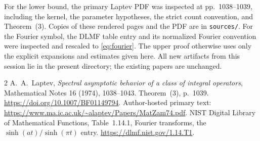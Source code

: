 \documentclass[11pt]{article}
\begin{document}
For the lower bound, the primary Laptev PDF was inspected at
pp.~1038--1039, including the kernel, the parameter hypotheses, the
strict count convention, and Theorem~(3). Copies of these rendered
pages and the PDF are in \texttt{sources/}. For the Fourier symbol,
the DLMF table entry and its normalized Fourier convention were
inspected and rescaled to \eqref{eq:fourier}. The upper proof otherwise
uses only the explicit expansions and estimates given here.
All new artifacts from this session lie in the present directory;
the existing papers are unchanged.

\begin{thebibliography}{2}
A.~A.~Laptev, \emph{Spectral asymptotic behavior of a class of integral
operators}, Mathematical Notes 16 (1974), 1038--1043.
Theorem~(3), p.~1039.
\url{https://doi.org/10.1007/BF01149794}.
Author-hosted primary text:
\url{https://www.ma.ic.ac.uk/~alaptev/Papers/MatZam74.pdf}.
NIST Digital Library of Mathematical Functions, Table~1.14.1,
Fourier transforms, the $\sinh(at)/\sinh(\pi t)$ entry.
\url{https://dlmf.nist.gov/1.14.T1}.
\end{thebibliography}
\end{document}

